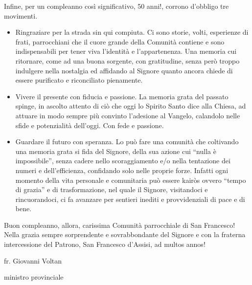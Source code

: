 Infine, per un compleanno così significativo, 50 anni!, corrono d’obbligo tre movimenti.
\begin{itemize}
\item Ringraziare per la strada sin qui compiuta. Ci sono storie, volti, esperienze di frati, 
parrocchiani che il cuore grande della Comunità contiene e sono indispensabili per tener viva 
l’identità e l’appartenenza. Una memoria cui ritornare, come ad una buona sorgente, con 
gratitudine, senza però troppo indulgere nella nostalgia ed affidando al Signore quanto ancora 
chiede di essere purificato e riconciliato pienamente.
\item Vivere il presente con fiducia e passione. La memoria grata del passato spinge, in ascolto 
attento di ciò che oggi lo Spirito Santo dice alla Chiesa, ad attuare in modo sempre più convinto 
l’adesione al Vangelo, calandolo nelle sfide e potenzialità dell’oggi. Con fede e passione.
\item Guardare il futuro con speranza. Lo può fare una comunità che coltivando una memoria 
grata si fida del Signore, della sua azione cui “nulla è impossibile”, senza cadere nello 
scoraggiamento e/o nella tentazione dei numeri e dell’efficienza, confidando solo nelle proprie 
forze. Infatti ogni momento della vita personale e comunitaria può essere kairòs ovvero “tempo di 
grazia” e di trasformazione, nel quale il Signore, visitandoci e rincuorandoci, ci fa avanzare per 
sentieri inediti e provvidenziali di pace e di bene.
\end{itemize}
\bigbreak
\noindent Buon compleanno, allora, carissima Comunità parrocchiale di San Francesco! Nella grazia sempre 
sorprendente e sovrabbondante del Signore e con la fraterna intercessione del Patrono, San 
Francesco d’Assisi,  ad multos annos!
\begin{flushright}
fr. Giovanni Voltan\par
ministro provinciale
\end{flushright}
